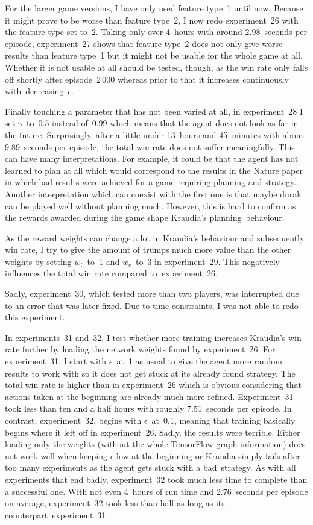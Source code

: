 \documentclass[a4paper,titlepage]{article}
\begin{document}
For the larger game versions, I have only used feature type~1 until now. Because it might prove to be worse than feature type~2, I now redo experiment~26 with the feature type set to~2. Taking only over 4~hours with around 2.98~seconds per episode, experiment~27 shows that feature type~2 does not only give worse results than feature type~1 but it might not be usable for the whole game at all. Whether it is not usable at all should be tested, though, as the win rate only falls off shortly after episode~2\,000 whereas prior to that it increases continuously with~decreasing~$\epsilon$.

Finally touching a parameter that has not been varied at all, in experiment~28 I set $\gamma$~to~0.5 instead of~0.99 which means that the agent does not look as far in the future. Surprisingly, after a little under 13~hours and 45~minutes with about 9.89~seconds per episode, the total win rate does not suffer meaningfully. This can have many interpretations. For example, it could be that the agent has not learned to plan at all which would correspond to the results in the Nature paper~\cite{nature} in which bad results were achieved for a game requiring planning and strategy. Another interpretation which can coexist with the first one is that maybe durak can be played well without planning much. However, this is hard to confirm as the rewards awarded during the game shape Kraudia's planning~behaviour.

As the reward weights can change a lot in Kraudia's behaviour and subsequently win rate, I try to give the amount of trumps much more value than the other weights by setting $w_t$~to~1 and $w_c$~to~3 in experiment~29. This negatively influences the total win rate compared to~experiment~26.

Sadly, experiment~30, which tested more than two players, was interrupted due to an error that was later fixed. Due to time constraints, I was not able to redo this experiment.

In experiments~31 and~32, I test whether more training increases Kraudia's win rate further by loading the network weights found by experiment~26. For experiment~31, I start with $\epsilon$~at~1 as usual to give the agent more random results to work with so it does not get stuck at its already found strategy. The total win rate is higher than in experiment~26 which is obvious considering that actions taken at the beginning are already much more refined. Experiment~31 took less than ten and a half hours with roughly 7.51~seconds per episode. In contrast, experiment~32, begins with $\epsilon$~at~0.1, meaning that training basically begins where it left off in experiment~26. Sadly, the results were terrible. Either loading only the weights (without the whole TensorFlow graph information) does not work well when keeping $\epsilon$ low at the beginning or Kraudia simply fails after too many experiments as the agent gets stuck with a bad~strategy. As with all experiments that end badly, experiment~32 took much less time to complete than a successful one. With not even 4~hours of run time and 2.76~seconds per episode on average, experiment~32 took less than half as long as its counterpart~experiment~31.
\end{document}
